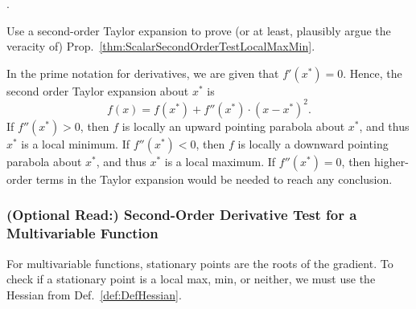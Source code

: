 \Qed.

\bigskip

\begin{example}
\label{ex:TaylorExpansionToProveDerivativeTest}
Use a second-order Taylor expansion to prove (or at least, plausibly argue the veracity of) Prop.~\ref{thm:ScalarSecondOrderTestLocalMaxMin}.   
\end{example}
\solution In the prime notation for derivatives, we are given that $f'(x^\ast) =0$. Hence, the second order Taylor expansion about $x^\ast$ is
$$ f(x) = f(x^\ast) + f{''}(x^\ast) \cdot (x-x^\ast)^2.$$
If $f{''}(x^\ast) >0$, then $f$ is locally an upward pointing parabola about $x^\ast$, and thus $x^\ast$ is a local minimum. If $f{''}(x^\ast) < 0$, then $f$ is locally a downward pointing parabola about $x^\ast$, and thus $x^\ast$ is a local maximum. If $f{''}(x^\ast) =0$, then higher-order terms in the Taylor expansion would be needed to reach any conclusion.
\Qed



\subsubsection{(Optional Read:) Second-Order Derivative Test for a Multivariable Function}

For multivariable functions, stationary points are the roots of the gradient. To check if a stationary point is a local max, min, or neither, we must use the Hessian from Def.~\ref{def:DefHessian}. 

